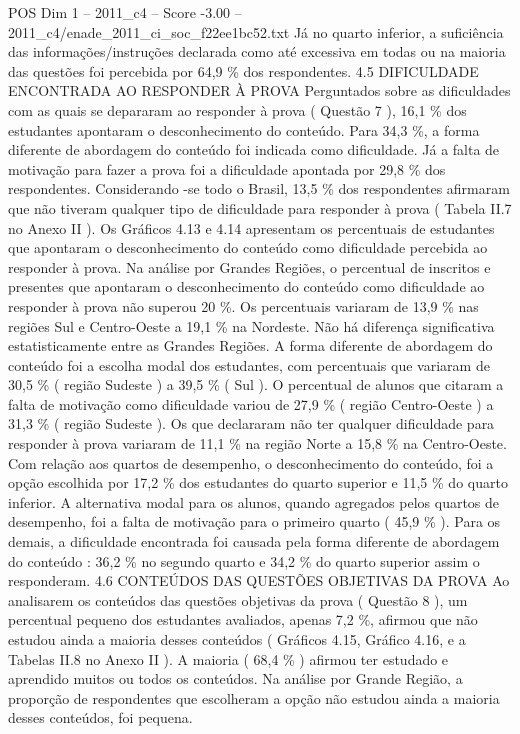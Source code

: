 \begin{textsample}{POS Dim 1 – 2011\_c4 – Score -3.00 – 2011\_c4/enade\_2011\_ci\_soc\_f22ee1bc52.txt}
Já no quarto inferior, a suficiência das informações/instruções declarada como até excessiva em todas ou na maioria das questões foi percebida por 64,9 \% dos respondentes. 4.5 DIFICULDADE ENCONTRADA AO RESPONDER À PROVA Perguntados sobre as dificuldades com as quais se depararam ao responder à prova ( Questão 7 ), 16,1 \% dos estudantes apontaram o desconhecimento do conteúdo.
Para 34,3 \%, a forma diferente de abordagem do conteúdo foi indicada como dificuldade.
Já a falta de motivação para fazer a prova foi a dificuldade apontada por 29,8 \% dos respondentes.
Considerando -se todo o Brasil, 13,5 \% dos respondentes afirmaram que não tiveram qualquer tipo de dificuldade para responder à prova ( Tabela II.7 no Anexo II ).
Os Gráficos 4.13 e 4.14 apresentam os percentuais de estudantes que apontaram o desconhecimento do conteúdo como dificuldade percebida ao responder à prova.
Na análise por Grandes Regiões, o percentual de inscritos e presentes que apontaram o desconhecimento do conteúdo como dificuldade ao responder à prova não superou 20 \%.
Os percentuais variaram de 13,9 \% nas regiões Sul e Centro-Oeste a 19,1 \% na Nordeste.
Não há diferença significativa estatisticamente entre as Grandes Regiões.
A forma diferente de abordagem do conteúdo foi a escolha modal dos estudantes, com percentuais que variaram de 30,5 \% ( região Sudeste ) a 39,5 \% ( Sul ).
O percentual de alunos que citaram a falta de motivação como dificuldade variou de 27,9 \% ( região Centro-Oeste ) a 31,3 \% ( região Sudeste ).
Os que declararam não ter qualquer dificuldade para responder à prova variaram de 11,1 \% na região Norte a 15,8 \% na Centro-Oeste.
Com relação aos quartos de desempenho, o desconhecimento do conteúdo, foi a opção escolhida por 17,2 \% dos estudantes do quarto superior e 11,5 \% do quarto inferior.
A alternativa modal para os alunos, quando agregados pelos quartos de desempenho, foi a falta de motivação para o primeiro quarto ( 45,9 \% ).
Para os demais, a dificuldade encontrada foi causada pela forma diferente de abordagem do conteúdo : 36,2 \% no segundo quarto e 34,2 \% do quarto superior assim o responderam. 4.6 CONTEÚDOS DAS QUESTÕES OBJETIVAS DA PROVA Ao analisarem os conteúdos das questões objetivas da prova ( Questão 8 ), um percentual pequeno dos estudantes avaliados, apenas 7,2 \%, afirmou que não estudou ainda a maioria desses conteúdos ( Gráficos 4.15, Gráfico 4.16, e a Tabelas II.8 no Anexo II ).
A maioria ( 68,4 \% ) afirmou ter estudado e aprendido muitos ou todos os conteúdos.
Na análise por Grande Região, a proporção de respondentes que escolheram a opção não estudou ainda a maioria desses conteúdos, foi pequena.

\end{textsample}
